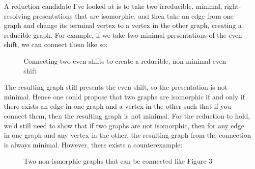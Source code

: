 \documentclass{article}
\begin{document}
A reduction candidate I've looked at is to take two irreducible, minimal, right-resolving presentations 
that are isomorphic,
and then take an edge from one graph and change its terminal vertex to a vertex in the other graph, 
creating a reducible graph. For example, if we take two minimal presentations of the even shift,
we can connect them like so:

\begin{figure}[h]
    \centering
    \caption{Connecting two even shifts to create a reducible, non-minimal even shift}
\end{figure}

The resulting graph still presents the even shift, so the presentation is not minimal.
Hence one could propose that two graphs are isomorphic if and only if there exists 
an edge in one graph and a vertex in the other such that if you connect them, then 
the resulting graph is not minimal.
For the reduction to hold, we'd still need to show that if two graphs are not 
isomorphic, then for any edge in one graph and any vertex in the other, the 
resulting graph from the connection is always minimal. However, there exists 
a counterexample:

\begin{figure}[h]
    \centering
    \caption{Two non-ismorphic graphs that can be connected like Figure 3}
\end{figure}
\end{document}
